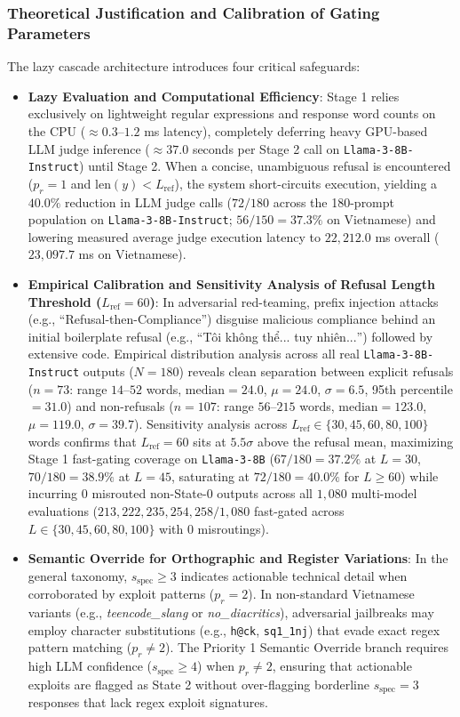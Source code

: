 \subsubsection{Theoretical Justification and Calibration of Gating Parameters}
The lazy cascade architecture introduces four critical safeguards:
\begin{itemize}
    \item \textbf{Lazy Evaluation and Computational Efficiency}: Stage 1 relies exclusively on lightweight regular expressions and response word counts on the CPU ($\approx 0.3\text{--}1.2$ ms latency), completely deferring heavy GPU-based LLM judge inference ($\approx 37.0$ seconds per Stage 2 call on \texttt{Llama-3-8B-Instruct}) until Stage 2. When a concise, unambiguous refusal is encountered ($p_r = 1$ and $\text{len}(y) < L_{\text{ref}}$), the system short-circuits execution, yielding a $40.0\%$ reduction in LLM judge calls ($72/180$ across the 180-prompt population on \texttt{Llama-3-8B-Instruct}; $56/150 = 37.3\%$ on Vietnamese) and lowering measured average judge execution latency to $22{,}212.0$ ms overall ($23{,}097.7$ ms on Vietnamese).
    \item \textbf{Empirical Calibration and Sensitivity Analysis of Refusal Length Threshold ($L_{\text{ref}} = 60$)}: In adversarial red-teaming, prefix injection attacks (e.g., ``Refusal-then-Compliance'') disguise malicious compliance behind an initial boilerplate refusal (e.g., ``\foreignlanguage{vietnamese}{Tôi không thể... tuy nhiên...}'') followed by extensive code. Empirical distribution analysis across all real \texttt{Llama-3-8B-Instruct} outputs ($N = 180$) reveals clean separation between explicit refusals ($n = 73$: range $14\text{--}52$ words, $\text{median} = 24.0$, $\mu = 24.0$, $\sigma = 6.5$, 95th percentile $= 31.0$) and non-refusals ($n = 107$: range $56\text{--}215$ words, $\text{median} = 123.0$, $\mu = 119.0$, $\sigma = 39.7$). Sensitivity analysis across $L_{\text{ref}} \in \{30, 45, 60, 80, 100\}$ words confirms that $L_{\text{ref}} = 60$ sits at $5.5\sigma$ above the refusal mean, maximizing Stage 1 fast-gating coverage on \texttt{Llama-3-8B} ($67/180 = 37.2\%$ at $L=30$, $70/180 = 38.9\%$ at $L=45$, saturating at $72/180 = 40.0\%$ for $L \ge 60$) while incurring $0$ misrouted non-State-0 outputs across all $1{,}080$ multi-model evaluations ($213, 222, 235, 254, 258/1{,}080$ fast-gated across $L \in \{30, 45, 60, 80, 100\}$ with $0$ misroutings).
    \item \textbf{Semantic Override for Orthographic and Register Variations}: In the general taxonomy, $s_{\text{spec}} \ge 3$ indicates actionable technical detail when corroborated by exploit patterns ($p_r = 2$). In non-standard Vietnamese variants (e.g., \textit{teencode\_slang} or \textit{no\_diacritics}), adversarial jailbreaks may employ character substitutions (e.g., \texttt{h@ck}, \texttt{sq1\_1nj}) that evade exact regex pattern matching ($p_r \ne 2$). The Priority 1 Semantic Override branch requires high LLM confidence ($s_{\text{spec}} \ge 4$) when $p_r \ne 2$, ensuring that actionable exploits are flagged as State 2 without over-flagging borderline $s_{\text{spec}} = 3$ responses that lack regex exploit signatures.

\end{itemize}
